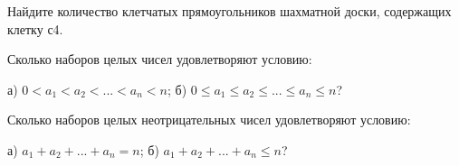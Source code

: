 \begin{thm}
    Найдите количество клетчатых прямоугольников шахматной доски, содержащих клетку с4.
\end{thm}

\begin{thm}
    Сколько наборов целых чисел удовлетворяют условию:
    \par
    а) $0 < a_1 < a_2 < ... < a_n < n$; \hfill б) $0 \leq a_1 \leq a_2 \leq ... \leq a_n \leq n$? 
\end{thm}

\begin{thm}
    Сколько наборов целых неотрицательных чисел удовлетворяют условию:
    \par
    а) $a_1 + a_2 + ... + a_n = n$; \hfill б) $a_1 + a_2 + ... + a_n \leq n$? 
\end{thm}
